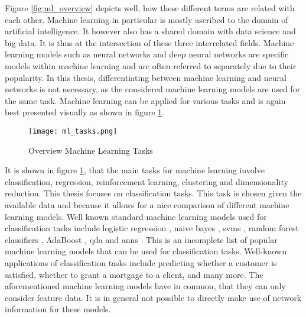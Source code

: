 	\noindent Figure \ref{fig:ml_overview} depicts well, how these different
	terms are related with each other. Machine learning in particular is
	mostly ascribed to the domain of artificial intelligence. It however also 
	has a shared domain with data science and big data. It is thus at the
	intersection of these three interrelated fields. Machine learning models 
	such as neural networks and deep neural networks are specific models within
	machine learning and are often referred to separately due to their
	popularity. In this thesis, differentiating between machine learning and
	neural networks is not necessary, as the considered machine learning models
	are used for the same task. Machine learning can be applied for various
	tasks and is again best presented visually as shown in figure 
	\ref{fig:ml_tasks}.

	\begin{figure}[h]
		\centering
		\texttt{[image: ml\_tasks.png]}
		\caption{Overview Machine Learning Tasks}
		\citep{Artisan2020}
		\label{fig:ml_tasks}
	\end{figure} 

	\noindent It is shown in figure \ref{fig:ml_tasks}, that the main tasks for
	machine learning involve classification, regression, reinforcement
	learning, clustering and dimensionality reduction. This thesis focuses on 
	classification tasks. This task is chosen given the available data and 
	because it allows for a nice comparison of different machine learning models. 
	Well known standard machine learning models used for classification tasks 
	include logistic regression \citep{cramer2002origins}, naive bayes 
	\citep{zhang2004bayes}, \acp{svm} \citep{platt1999probabilistic}, 
	random forest classifiers \citep{breiman2001random}, AdaBoost 
	\citep{freund1997decision}, \ac{qda} \citep{tharwat2016linear} and 
	\acp{ann} \citep{mcculloch1943logical,werbos1974beyond}. This is an 
	incomplete list of popular machine learning models that can be used for 
	classification tasks. Well-known applications of classification tasks include 
	predicting whether a customer is satisfied, whether to grant a mortgage to 
	a client, and many more. The aforementioned machine learning models have in 
	common, that they can only consider feature data. It is in general not 
	possible to directly make use of network information for these models. \\

